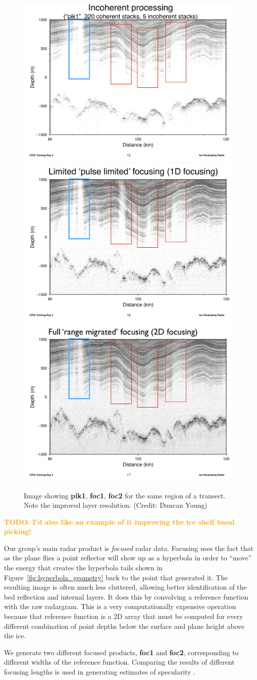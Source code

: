 \documentclass[11pt]{article}
\newcommand{\future}[1]{\ifthenelse{\boolean{include-future}} {\textcolor{Orange}{\textbf{TODO: #1}}}{}}
\newcommand{\figref}[1]{Figure~\ref{#1}}
\begin{document}
\begin{figure}[ht!]
\centering
\includegraphics[width=0.325\columnwidth]{figures/DAY_pik1.pdf}
\includegraphics[width=0.325\columnwidth]{figures/DAY_foc1.pdf}
\includegraphics[width=0.325\columnwidth]{figures/DAY_foc2.pdf}
\caption[]{Image showing \textbf{pik1}, \textbf{foc1}, \textbf{foc2} for the same region of a transect. Note the improved layer resolution. (Credit: Duncan Young)}
\end{figure}
\future{I'd also like an example of it improving the ice shelf basal picking!}

Our group's main radar product is \emph{focused} radar data. Focusing uses the fact that as the plane flies a point reflector will show up as a hyperbola in order to ``move'' the energy that creates the hyperbola tails shown in \figref{fig:hyperbola_geometry} back to the point that generated it. The resulting image is often much less cluttered, allowing better identification of the bed reflection and internal layers. It does this by convolving a reference function with the raw radargram. This is a very computationally expensive operation because that reference function is a 2D array that must be computed for every different combination of point depths below the surface and plane height above the ice. 

We generate two different focused products, \textbf{foc1} and \textbf{foc2}, corresponding to different widths of the reference function.
Comparing the results of different focusing lengths is used in generating estimates of specularity \cite{Schroeder2015}.
\end{document}
